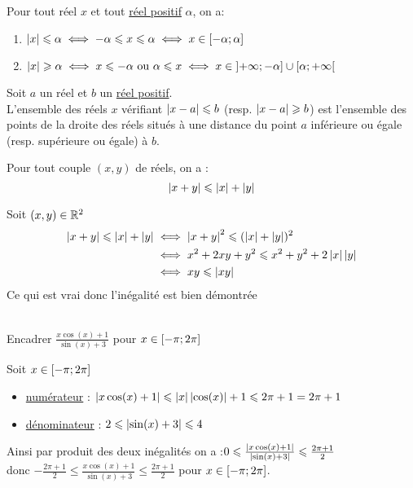 \begin{defprop}
	Pour tout réel \(x\) et tout \underline{réel positif} \(\alpha\), on a:
	\begin{enumerate}
		\item \(\left\lvert x\right\rvert\leqslant \alpha \iff -\alpha \leqslant x \leqslant \alpha \iff x \in \left[-\alpha;\alpha\right]\)
		\item \(\left\lvert x\right\rvert\geqslant \alpha \iff x \leqslant -\alpha\text{ ou } \alpha \leqslant x \iff x \in \left]+\infty;-\alpha\right]\cup\left[\alpha;+\infty\right[\)
	\end{enumerate}
\end{defprop}

\begin{defprop}
	Soit \(a\) un réel et \(b\) un \underline{réel positif}. \\
	L’ensemble des réels \(x\) vérifiant \(\left\lvert x-a\right\rvert\leqslant b\) (resp. \(\left\lvert x-a\right\rvert\geqslant b \)) est l’ensemble des points de la droite des
	réels situés à une distance du point \(a\) inférieure ou égale (resp. supérieure ou égale) à \(b\).
\end{defprop}

\begin{prop}
	Pour tout couple \((x,y)\) de réels, on a :
	\[\left\lvert x+y\right\rvert\leqslant \left\lvert x\right\rvert+\left\lvert y\right\rvert\]
\end{prop}

\begin{dem} 
	Soit \((x,y) \in \mathbb{R}^2\)
	\begin{align*}
		\left\lvert x+y\right\rvert\leqslant \left\lvert x\right\rvert+\left\lvert y\right\rvert & \iff \left\lvert x+y\right\rvert^2\leqslant (\left\lvert x\right\rvert+\left\lvert y\right\rvert)^2      \\
		                              & \iff x^2+2xy+y^2 \leqslant x^2+y^2+2\left\lvert x\right\rvert\left\lvert y\right\rvert \\
		                              & \iff xy\leqslant \left\lvert xy\right\rvert
	\end{align*}
	Ce qui est vrai donc l'inégalité est bien démontrée
\end{dem}

\begin{exoex}   
     ~\\
	Encadrer \(\frac{x\cos(x)+1}{\sin(x)+3}\) pour \(x\in\left[-\pi;2\pi\right]\)
\end{exoex}

\begin{corr}
	Soit \(x\in\left[-\pi;2\pi\right]\)
	\begin{itemize}

		\item \underline{numérateur} : \(\left\lvert x\cos(x)+1\right\rvert\leqslant \left\lvert x\right\rvert\left\lvert\cos(x)\right\rvert+1\leqslant 2\pi+1 = 2\pi+1\)
		\item \underline{dénominateur} : \(2\leqslant\left\lvert\sin(x)+3\right\rvert\leqslant 4\)

	\end{itemize}
	Ainsi par produit des deux inégalités on a :\(0\leqslant\frac{\left\lvert x\cos(x)+1\right\rvert}{\left\lvert\sin(x)+3\right\rvert}\leqslant \frac{2\pi+1}{2} \)\\
	donc \(-\frac{2\pi+1}{2} \leq \frac{x\cos(x)+1}{\sin(x)+3} \leq \frac{2\pi+1}{2}\) pour \(x\in\left[-\pi;2\pi\right]\).
\end{corr}

